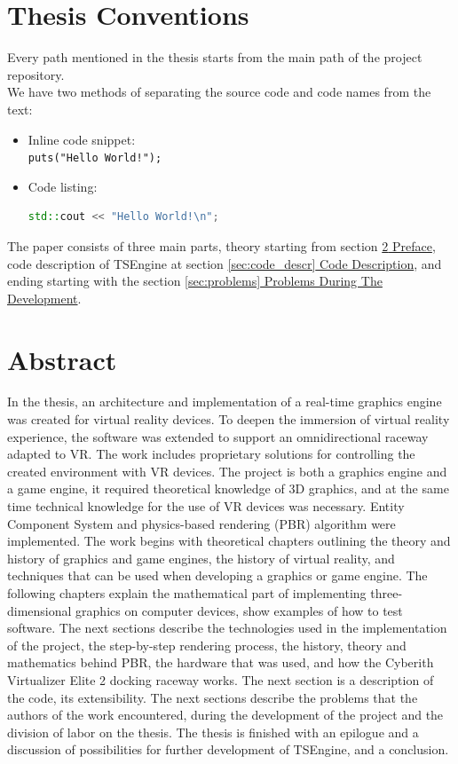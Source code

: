 \newpage
\section{Thesis Conventions}
Every path mentioned in the thesis starts from the main path of the project repository.\\
We have two methods of separating the source code and code names from the text:
\begin{itemize}
    \item Inline code snippet:\\
    \texttt{puts("Hello World!");}
    \item Code listing:
\begin{lstlisting}[language=c++, caption=Example code snippet (./example\_dir/example\_file.cpp)]
std::cout << "Hello World!\n";
\end{lstlisting}
\end{itemize}
The paper consists of three main parts, theory starting from section \hyperref[sec:preface]{\ref*{sec:preface} Preface}, code description of TSEngine at section \hyperref[sec:code_descr]{\ref*{sec:code_descr} Code Description}, and ending starting with the section \hyperref[sec:problems]{\ref*{sec:problems} Problems During The Development}.

\newpage
\section{Abstract} 
\label{sec:preface}
\hspace{\parindent}
In the thesis, an architecture and implementation of a real-time graphics engine was created for virtual reality devices. To deepen the immersion of virtual reality experience, the software was extended to support an omnidirectional raceway adapted to VR. The work includes proprietary solutions for controlling the created environment with VR devices. The project is both a graphics engine and a game engine, it required theoretical knowledge of 3D graphics, and at the same time technical knowledge for the use of VR devices was necessary. Entity Component System and physics-based rendering (PBR) algorithm were implemented. The work begins with theoretical chapters outlining the theory and history of graphics and game engines, the history of virtual reality, and techniques that can be used when developing a graphics or game engine. The following chapters explain the mathematical part of implementing three-dimensional graphics on computer devices, show examples of how to test software. The next sections describe the technologies used in the implementation of the project, the step-by-step rendering process, the history, theory and mathematics behind PBR, the hardware that was used, and how the Cyberith Virtualizer Elite 2 docking raceway works. The next section is a description of the code, its extensibility. The next sections describe the problems that the authors of the work encountered, during the development of the project and the division of labor on the thesis. The thesis is finished with an epilogue and a discussion of possibilities for further development of TSEngine, and a conclusion.

